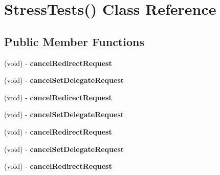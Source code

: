 \hypertarget{interface_stress_tests_07_08}{
\section{\-Stress\-Tests() \-Class \-Reference}
\label{interface_stress_tests_07_08}
}
\subsection*{\-Public \-Member \-Functions}
\begin{DoxyCompactItemize}
\item 
\hypertarget{interface_stress_tests_07_08_a4670f6c57144f2cb491100fa08a371ce}{
(void) -\/ {\bfseries cancel\-Redirect\-Request}}
\label{interface_stress_tests_07_08_a4670f6c57144f2cb491100fa08a371ce}

\item 
\hypertarget{interface_stress_tests_07_08_a3831437968ca1cbf2a0c01fdd57e05f6}{
(void) -\/ {\bfseries cancel\-Set\-Delegate\-Request}}
\label{interface_stress_tests_07_08_a3831437968ca1cbf2a0c01fdd57e05f6}

\item 
\hypertarget{interface_stress_tests_07_08_a4670f6c57144f2cb491100fa08a371ce}{
(void) -\/ {\bfseries cancel\-Redirect\-Request}}
\label{interface_stress_tests_07_08_a4670f6c57144f2cb491100fa08a371ce}

\item 
\hypertarget{interface_stress_tests_07_08_a3831437968ca1cbf2a0c01fdd57e05f6}{
(void) -\/ {\bfseries cancel\-Set\-Delegate\-Request}}
\label{interface_stress_tests_07_08_a3831437968ca1cbf2a0c01fdd57e05f6}

\item 
\hypertarget{interface_stress_tests_07_08_a4670f6c57144f2cb491100fa08a371ce}{
(void) -\/ {\bfseries cancel\-Redirect\-Request}}
\label{interface_stress_tests_07_08_a4670f6c57144f2cb491100fa08a371ce}

\item 
\hypertarget{interface_stress_tests_07_08_a3831437968ca1cbf2a0c01fdd57e05f6}{
(void) -\/ {\bfseries cancel\-Set\-Delegate\-Request}}
\label{interface_stress_tests_07_08_a3831437968ca1cbf2a0c01fdd57e05f6}

\item 
\hypertarget{interface_stress_tests_07_08_a4670f6c57144f2cb491100fa08a371ce}{
(void) -\/ {\bfseries cancel\-Redirect\-Request}}
\label{interface_stress_tests_07_08_a4670f6c57144f2cb491100fa08a371ce}


\end{DoxyCompactItemize}
